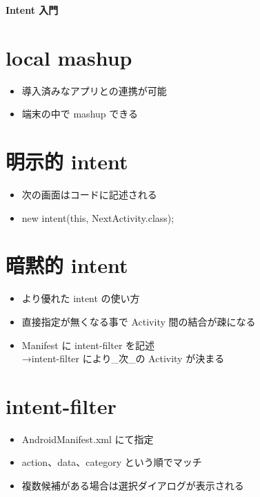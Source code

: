 \documentclass[slide,papersize]{jsarticle}
\begin{document}
\vspace*{15mm}
\begin{center}
{\Huge {\bf Intent 入門}}
\end{center}

\section*{local mashup}
\bigskip
\begin{itemize}
\item 導入済みなアプリとの連携が可能
\bigskip
\item 端末の中で mashup できる
\end{itemize}

\section*{明示的 intent}
\bigskip
\begin{itemize}
\item 次の画面はコードに記述される
\bigskip
\item new intent(this, NextActivity.class);
\end{itemize}

\section*{暗黙的 intent}
\bigskip
\begin{itemize}
\item より優れた intent の使い方
\bigskip
\item 直接指定が無くなる事で Activity 間の結合が疎になる
\bigskip
\item Manifest に intent-filter を記述\\→intent-filter により\_次\_の Activity が決まる
\end{itemize}

\section*{intent-filter}
\bigskip
\begin{itemize}
\item AndroidManifest.xml にて指定
\bigskip
\item action、data、category という順でマッチ
\bigskip
\item 複数候補がある場合は選択ダイアログが表示される
\end{itemize}
\end{document}
